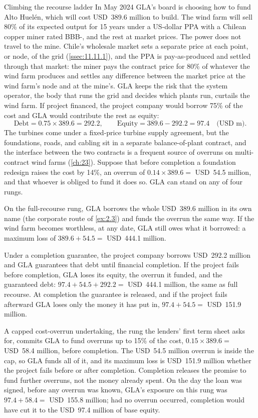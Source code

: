 \begin{example}{Climbing the recourse ladder \illustrative}\label{ex:2.1}
In May 2024 GLA's board is choosing how to fund Alto Huelén, which will cost USD~389.6 million to build. The wind farm will sell 80\% of its expected output for 15 years under a US-dollar PPA with a Chilean copper miner rated BBB-, and the rest at market prices. The power does not travel to the mine. Chile's wholesale market sets a separate price at each point, or node, of the grid (\cref{ssec:11.11.1}), and the PPA is pay-as-produced and settled through that market: the miner pays the contract price for 80\% of whatever the wind farm produces and settles any difference between the market price at the wind farm's node and at the mine's. GLA keeps the risk that the system operator, the body that runs the grid and decides which plants run, curtails the wind farm. If project financed, the project company would borrow 75\% of the cost and GLA would contribute the rest as equity:
\begin{equation*}
\text{Debt} = 0.75 \times 389.6 = 292.2, \qquad \text{Equity} = 389.6 - 292.2 = 97.4 \quad \text{(USD m)}.
\end{equation*}
The turbines come under a fixed-price turbine supply agreement, but the foundations, roads, and cabling sit in a separate balance-of-plant contract, and the interface between the two contracts is a frequent source of overruns on multi-contract wind farms (\cref{ch:23}). Suppose that before completion a foundation redesign raises the cost by 14\%, an overrun of $0.14 \times 389.6 = $ USD~54.5 million, and that whoever is obliged to fund it does so. GLA can stand on any of four rungs.

On the full-recourse rung, GLA borrows the whole USD~389.6 million in its own name (the corporate route of \cref{ex:2.3}) and funds the overrun the same way. If the wind farm becomes worthless, at any date, GLA still owes what it borrowed: a maximum loss of $389.6 + 54.5 = $ USD~444.1 million.

Under a completion guarantee, the project company borrows USD~292.2 million and GLA guarantees that debt until financial completion. If the project fails before completion, GLA loses its equity, the overrun it funded, and the guaranteed debt: $97.4 + 54.5 + 292.2 = $ USD~444.1 million, the same as full recourse. At completion the guarantee is released, and if the project fails afterward GLA loses only the money it has put in, $97.4 + 54.5 = $ USD~151.9 million.

A capped cost-overrun undertaking, the rung the lenders' first term sheet asks for, commits GLA to fund overruns up to 15\% of the cost, $0.15 \times 389.6 = $ USD~58.4 million, before completion. The USD~54.5 million overrun is inside the cap, so GLA funds all of it, and its maximum loss is USD~151.9 million whether the project fails before or after completion. Completion releases the promise to fund further overruns, not the money already spent. On the day the loan was signed, before any overrun was known, GLA's exposure on this rung was $97.4 + 58.4 = $ USD~155.8 million; had no overrun occurred, completion would have cut it to the USD~97.4 million of base equity.


\end{example}
